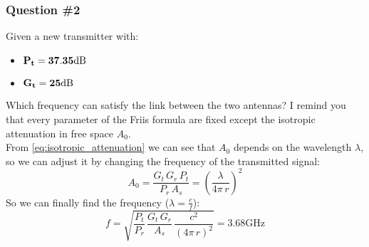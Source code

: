 \subsubsection*{Question \#2}
Given a new transmitter with:
\begin{itemize}
    \item $\bf{P_t}=37.35\si{\deci\bel}$
    \item $\bf{G_t}=25\si{\deci\bel}$
\end{itemize}
Which frequency can satisfy the link between the two antennas? I remind you that every parameter of the Friis formula are fixed except the isotropic attenuation in free space $A_0$.\\
From \cref{eq:isotropic_attenuation} we can see that $A_0$ depends on the wavelength $\lambda$, so we can adjust it by changing the frequency of the transmitted signal:
\begin{equation*}
    A_0=\frac{G_t\,G_r\,P_t}{P_r\,A_s}=\left(\frac{\lambda}{4\pi\,r}\right)^2
\end{equation*}
So we can finally find the frequency ($\lambda=\frac{c}{f}$):
\begin{equation*}
    f=\sqrt{\frac{P_t}{P_r}\,\frac{G_t\,G_r}{A_s}\,\frac{c^2}{(4\pi\,r)^2}}=3.68\si{\giga\hertz}
\end{equation*}
